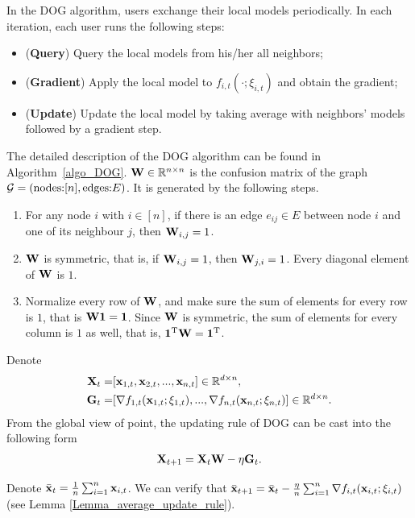 \documentclass{article}
\begin{document}
In the DOG algorithm, users exchange their local models periodically. In each iteration, each user runs the following steps:
\begin{itemize}
\item ({\bf Query}) Query the local models from his/her all neighbors;
\item ({\bf Gradient}) Apply the local model to $f_{i,t}(\cdot; \xi_{i,t})$ and obtain the gradient;
\item ({\bf Update}) Update the local model by taking average with neighbors' models followed by a gradient step.
\end{itemize}
The detailed description of the DOG algorithm can be found in Algorithm~\ref{algo_DOG}.   ${\bf W}\in\mathbb{R}^{n\times n}$ is the confusion matrix of the graph ${\mathcal{G}}=(\text{nodes:} [n], \text{edges:} E)$. It is generated by the following steps.
\begin{enumerate}
\item For any node $i$ with $i\in[n]$, if there is an edge $e_{ij}\in E$ between node $i$ and one of its neighbour $j$, then ${\bf W}_{i,j} = 1$.
\item ${\bf W}$ is symmetric, that is, if ${\bf W}_{i,j} = 1$, then ${\bf W}_{j,i} = 1$. Every diagonal element of ${\bf W}$ is $1$.
\item Normalize every row of ${\bf W}$, and make sure the sum of elements for every row is $1$, that is ${\bf W}{\bf 1} = {\bf 1}$. Since ${\bf W}$ is symmetric, the sum of elements for every column is $1$ as well, that is, ${\bf 1}^{\rm T}{\bf W} = {\bf 1}^{\rm T}$.
\end{enumerate}

 



Denote
\begin{align}
\nonumber
{\bf X}_t = &  [{\bf x}_{1,t}, {\bf x}_{2,t}, ..., {\bf x}_{n,t}] \in \mathbb{R}^{d\times n}, \\ \nonumber
{\bf G}_t = & [\nabla f_{1,t}({\bf x}_{1,t};\xi_{1,t}), ..., \nabla f_{n,t}({\bf x}_{n,t};\xi_{n,t})] \in \mathbb{R}^{d\times n}.
\end{align} 
From the global view of point, the updating rule of DOG can be cast into the following form
\begin{align}
\nonumber
{\bf X}_{t+1} = {\bf X}_{t}{\bf W} - \eta {\bf G}_t.
\end{align}

Denote $\bar{{\bf x}}_t = \frac{1}{n}\sum_{i=1}^n {\bf x}_{i,t}$. We can verify that $\bar{{\bf x}}_{t+1} =  \bar{{\bf x}}_t -  \frac{\eta}{n}\sum_{i=1}^n \nabla f_{i,t}({\bf x}_{i,t};\xi_{i,t})$ (see Lemma \ref{Lemma_average_update_rule}). 
\end{document}
